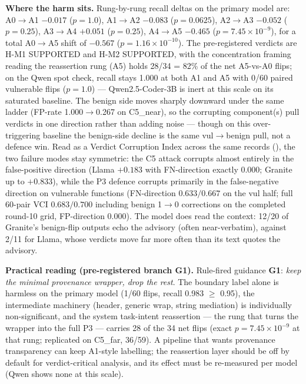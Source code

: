 \textbf{Where the harm sits.} Rung-by-rung recall deltas on the primary
model are: A0$\rightarrow$A1
$-0.017$ ($p=1.0$), A1$\rightarrow$A2
$-0.083$ ($p=0.0625$), A2$\rightarrow$A3
$-0.052$ ($p=0.25$), A3$\rightarrow$A4
$+0.051$ ($p=0.25$), A4$\rightarrow$A5
$-0.465$ ($p=7.45{\times}10^{-9}$), for a total
A0$\rightarrow$A5 shift of $-0.567$
($p=1.16{\times}10^{-10}$). The pre-registered verdicts are
H-M1 SUPPORTED and H-M2 SUPPORTED,
with the concentration framing reading
the reassertion rung (A5) holds 28/34 = 82\% of the net A5-vs-A0 flips; on the Qwen spot check,
recall stays 1.000 at both A1 and A5 with 0/60 paired vulnerable flips ($p=1.0$) --- Qwen2.5-Coder-3B is inert at this scale on its saturated baseline. The benign side moves
sharply downward under the same ladder (FP-rate
1.000$\rightarrow$0.267 on
C5\_near), so the corrupting component(s) pull verdicts in one direction
rather than adding noise --- though on this over-triggering baseline the
benign-side decline is the same vul$\to$benign pull, not a defence win.
Read as a Verdict Corruption Index across the same records
(), the two failure modes stay
symmetric: the C5 attack corrupts almost entirely in the false-positive
direction (Llama $+0.183$ with FN-direction exactly 0.000; Granite up to
$+0.833$), while the P3 defence corrupts primarily in the false-negative
direction on vulnerable functions (FN-direction $0.633/0.667$ on the vul
half; full 60-pair VCI $0.683/0.700$ including benign 1$\to$0 corrections
on the completed round-10 grid, FP-direction 0.000). The model does read the
context: 12/20 of Granite's benign-flip outputs echo the advisory (often
near-verbatim), against 2/11 for Llama, whose verdicts move far more often
than its text quotes the advisory.

\textbf{Practical reading (pre-registered branch G1).} Rule-fired guidance
\textbf{G1}: \emph{keep the minimal provenance wrapper, drop the rest}.
The boundary label alone is harmless on the primary model (1/60 flips, recall 0.983 $\geq$ 0.95), the intermediate machinery (header, generic wrap, string mediation) is individually non-significant, and the system task-intent reassertion --- the rung that turns the wrapper into the full P3 --- carries 28 of the 34 net flips (exact $p=7.45{\times}10^{-9}$ at that rung; replicated on C5\_far, 36/59). A pipeline that wants provenance transparency can keep A1-style labelling; the reassertion layer should be off by default for verdict-critical analysis, and its effect must be re-measured per model (Qwen shows none at this scale).

